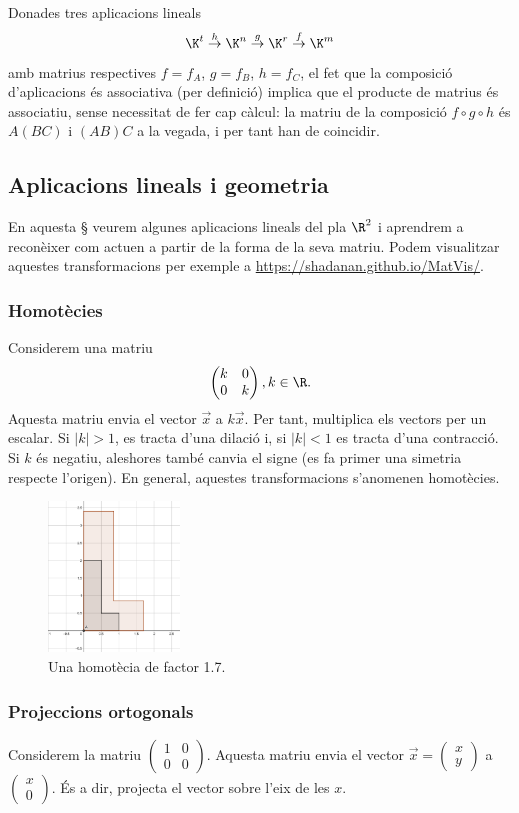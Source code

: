 \begin{exemple}
	Donades tres aplicacions lineals
	\[
	\K^t\stackrel{h}{\rightarrow}\K^n \stackrel{g}{\rightarrow} \K^r \stackrel{f}{\rightarrow} \K^m
	\]
	amb matrius respectives $f=f_A$, $g=f_B$, $h=f_C$, el fet que la composició d'aplicacions és associativa (per definició) implica que el producte de matrius és associatiu, sense necessitat de fer cap càlcul: la matriu de la composició $f\circ g \circ h$ és $A(BC)$ i $(AB)C$ a la vegada, i per tant han de coincidir.
\end{exemple}
\subsection{Aplicacions lineals i geometria}\label{subsec:linealgeom}
En aquesta \S{} veurem algunes aplicacions lineals del pla $\R^2$ i aprendrem a reconèixer com actuen a partir de la forma de la seva matriu. Podem visualitzar aquestes transformacions per exemple a \url{https://shadanan.github.io/MatVis/}.

\subsubsection{Homotècies}
Considerem una matriu
\[
\begin{pmatrix} k & 0\\0 & k\end{pmatrix}, k\in \R.
\]
Aquesta matriu envia el vector $\vec x$ a $k\vec x$. Per tant, multiplica els vectors per un escalar. Si $|k|>1$, es tracta d'una dilació i, si $|k|< 1$ es tracta d'una contracció. Si $k$ és negatiu, aleshores també canvia el signe (es fa primer una simetria respecte l'origen). En general, aquestes transformacions s'anomenen homotècies.
\begin{figure}[ht]
    \centering
    \includegraphics[height=4cm]{escalat.png}
    \caption{Una homotècia de factor 1.7.}
    \label{fig:homotecia}
\end{figure}
\subsubsection{Projeccions ortogonals}
Considerem la matriu $\begin{pmatrix}1&0\\0&0\end{pmatrix}$. Aquesta matriu envia el vector $\vec x = \begin{pmatrix}x\\y\end{pmatrix}$ a $\begin{pmatrix}x\\0\end{pmatrix}$. És a dir, projecta el vector sobre l'eix de les $x$.

